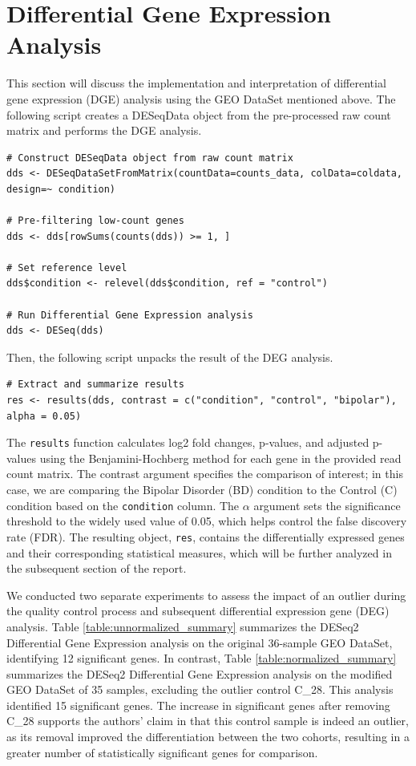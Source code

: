 \documentclass{article}
\begin{document}
\section{Differential Gene Expression Analysis}
This section will discuss the implementation and interpretation of differential gene expression (DGE) analysis using the GEO DataSet mentioned above. The following script creates a DESeqData object from the pre-processed raw count matrix and performs the DGE analysis.
\begin{verbatim}
# Construct DESeqData object from raw count matrix
dds <- DESeqDataSetFromMatrix(countData=counts_data, colData=coldata, design=~ condition)

# Pre-filtering low-count genes
dds <- dds[rowSums(counts(dds)) >= 1, ]

# Set reference level
dds$condition <- relevel(dds$condition, ref = "control")

# Run Differential Gene Expression analysis
dds <- DESeq(dds)
\end{verbatim}
Then, the following script unpacks the result of the DEG analysis.
\begin{verbatim}
# Extract and summarize results
res <- results(dds, contrast = c("condition", "control", "bipolar"), alpha = 0.05)
\end{verbatim}
The \texttt{results} function calculates log2 fold changes, p-values, and adjusted p-values using the Benjamini-Hochberg method for each gene in the provided read count matrix. The contrast argument specifies the comparison of interest; in this case, we are comparing the Bipolar Disorder (BD) condition to the Control (C) condition based on the \texttt{condition} column. The $\alpha$ argument sets the significance threshold to the widely used value of 0.05, which helps control the false discovery rate (FDR). The resulting object, \texttt{res}, contains the differentially expressed genes and their corresponding statistical measures, which will be further analyzed in the subsequent section of the report.

We conducted two separate experiments to assess the impact of an outlier during the quality control process and subsequent differential expression gene (DEG) analysis. Table \ref{table:unnormalized_summary} summarizes the DESeq2 Differential Gene Expression analysis on the original 36-sample GEO DataSet, identifying 12 significant genes. In contrast, Table \ref{table:normalized_summary} summarizes the DESeq2 Differential Gene Expression analysis on the modified GEO DataSet of 35 samples, excluding the outlier control C\_28. This analysis identified 15 significant genes. The increase in significant genes after removing C\_28 supports the authors' claim in \cite{pacifico2017transcriptome} that this control sample is indeed an outlier, as its removal improved the differentiation between the two cohorts, resulting in a greater number of statistically significant genes for comparison.
\end{document}
